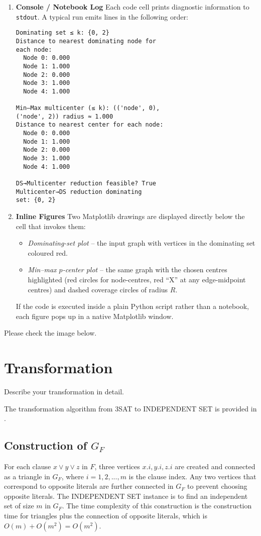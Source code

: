 \documentclass[conference]{IEEEtran}
\begin{document}
\begin{enumerate}
  \item \textbf{Console / Notebook Log}  
        Each code cell prints diagnostic information to \texttt{stdout}.  
        A typical run emits lines in the following order:
\begin{verbatim}
Dominating set ≤ k: {0, 2}
Distance to nearest dominating node for 
each node:
  Node 0: 0.000
  Node 1: 1.000
  Node 2: 0.000
  Node 3: 1.000
  Node 4: 1.000

Min–Max multicenter (≤ k): (('node', 0),
('node', 2)) radius ≈ 1.000
Distance to nearest center for each node:
  Node 0: 0.000
  Node 1: 1.000
  Node 2: 0.000
  Node 3: 1.000
  Node 4: 1.000

DS→Multicenter reduction feasible? True
Multicenter→DS reduction dominating 
set: {0, 2}
\end{verbatim}

  \item \textbf{Inline Figures}  
        Two Matplotlib drawings are displayed directly below the cell that
        invokes them:
        \begin{itemize}
          \item \emph{Dominating-set plot} – the input graph with vertices in the
                dominating set coloured red.
          \item \emph{Min–max \(p\)-center plot} – the same graph with the chosen
                centres highlighted (red circles for node-centres, red “X” at
                any edge-midpoint centres) and dashed coverage circles of radius
                \(R\).
        \end{itemize}
        If the code is executed inside a plain Python script rather than
        a notebook, each figure pops up in a native Matplotlib window.
\end{enumerate}

Please check the image below.

\section{Transformation}
Describe your transformation in detail.

The transformation algorithm from 3SAT to INDEPENDENT SET is provided in \cite{c:dpv}.

\subsection{Construction of $G_F$}
For each clause \(x \lor y \lor z\) in \(F\), three vertices \(x.i, y.i, z.i\) are created and connected as a triangle in \(G_F\), where \(i = 1, 2, ..., m\) is the clause index.
Any two vertices that correspond to opposite literals are further connected in \(G_F\) to prevent choosing opposite literals.
The INDEPENDENT SET instance is to find an independent set of size \(m\) in $G_F$.
The time complexity of this construction is the construction time for triangles plus the connection of opposite literals, which is \(O(m) + O(m^2) = O(m^2)\).
\end{document}

